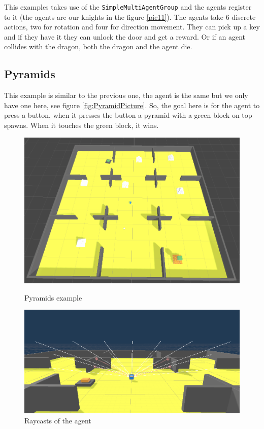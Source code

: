 \documentclass[a4paper, 12pt]{book}
\begin{document}
This examples takes use of the \texttt{SimpleMultiAgentGroup} and the agents register to it (the agents are our knights in the figure \ref{pic11}). The agents take 6 discrete actions, two for rotation and four for direction movement. They can pick up a key and if they have it they can unlock the door and get a reward. Or if an agent collides with the dragon, both the dragon and the agent die.

\subsection{Pyramids}

This example is similar to the previous one, the agent is the same but we only have one here, see figure \ref{fig:PyramidPicture}. So, the goal here is for the agent to press a button, when it presses the button a pyramid with a green block on top spawns. When it touches the green block, it wins.

\begin{figure}[ht]
  \includegraphics[width=\linewidth]{Images/PyramidsExample.png}
  \caption{Pyramids example}\label{fig:PyramidPicture}
\endminipage\hfill
{}
  \includegraphics[width=\linewidth]{Images/PyramidsRaycast.png}
  \caption{Raycasts of the agent}\label{fig:PyramidRaycasts}
\endminipage\hfill
\label{PyradmidsExample}
\end{figure}
\end{document}
